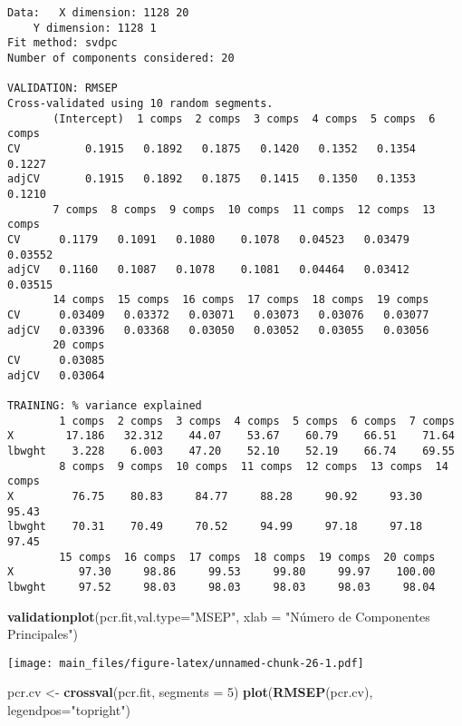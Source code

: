 \documentclass[]{article}
\newenvironment{Shaded}{\begin{snugshade}}{\end{snugshade}}
\newcommand{\KeywordTok}[1]{\textcolor[rgb]{0.13,0.29,0.53}{\textbf{#1}}}
\newcommand{\DataTypeTok}[1]{\textcolor[rgb]{0.13,0.29,0.53}{#1}}
\newcommand{\DecValTok}[1]{\textcolor[rgb]{0.00,0.00,0.81}{#1}}
\newcommand{\StringTok}[1]{\textcolor[rgb]{0.31,0.60,0.02}{#1}}
\newcommand{\NormalTok}[1]{#1}
\begin{document}
\begin{verbatim}
Data:   X dimension: 1128 20 
    Y dimension: 1128 1
Fit method: svdpc
Number of components considered: 20

VALIDATION: RMSEP
Cross-validated using 10 random segments.
       (Intercept)  1 comps  2 comps  3 comps  4 comps  5 comps  6 comps
CV          0.1915   0.1892   0.1875   0.1420   0.1352   0.1354   0.1227
adjCV       0.1915   0.1892   0.1875   0.1415   0.1350   0.1353   0.1210
       7 comps  8 comps  9 comps  10 comps  11 comps  12 comps  13 comps
CV      0.1179   0.1091   0.1080    0.1078   0.04523   0.03479   0.03552
adjCV   0.1160   0.1087   0.1078    0.1081   0.04464   0.03412   0.03515
       14 comps  15 comps  16 comps  17 comps  18 comps  19 comps
CV      0.03409   0.03372   0.03071   0.03073   0.03076   0.03077
adjCV   0.03396   0.03368   0.03050   0.03052   0.03055   0.03056
       20 comps
CV      0.03085
adjCV   0.03064

TRAINING: % variance explained
        1 comps  2 comps  3 comps  4 comps  5 comps  6 comps  7 comps
X        17.186   32.312    44.07    53.67    60.79    66.51    71.64
lbwght    3.228    6.003    47.20    52.10    52.19    66.74    69.55
        8 comps  9 comps  10 comps  11 comps  12 comps  13 comps  14 comps
X         76.75    80.83     84.77     88.28     90.92     93.30     95.43
lbwght    70.31    70.49     70.52     94.99     97.18     97.18     97.45
        15 comps  16 comps  17 comps  18 comps  19 comps  20 comps
X          97.30     98.86     99.53     99.80     99.97    100.00
lbwght     97.52     98.03     98.03     98.03     98.03     98.04
\end{verbatim}

\begin{Shaded}
\begin{Highlighting}[]
\KeywordTok{validationplot}\NormalTok{(pcr.fit,}\DataTypeTok{val.type=}\StringTok{"MSEP"}\NormalTok{, }\DataTypeTok{xlab =} \StringTok{"Número de Componentes Principales"}\NormalTok{)}
\end{Highlighting}
\end{Shaded}

\texttt{[image: main\_files/figure-latex/unnamed-chunk-26-1.pdf]}

\begin{Shaded}
\begin{Highlighting}[]
\NormalTok{pcr.cv <-}\StringTok{ }\KeywordTok{crossval}\NormalTok{(pcr.fit, }\DataTypeTok{segments =} \DecValTok{5}\NormalTok{)}
\KeywordTok{plot}\NormalTok{(}\KeywordTok{RMSEP}\NormalTok{(pcr.cv), }\DataTypeTok{legendpos=}\StringTok{"topright"}\NormalTok{)}
\end{Highlighting}
\end{Shaded}
\end{document}
